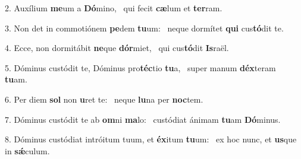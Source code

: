 2. Auxílium \textbf{me}um a \textbf{Dó}mino, \ast\  qui fecit \textbf{cæ}lum et \textbf{ter}ram.\

3. Non det in commotiónem \textbf{pe}dem \textbf{tu}um: \ast\  neque dormítet \textbf{qui} cus\textbf{tó}dit te.\

4. Ecce, non dormitábit \textbf{ne}que \textbf{dór}miet, \ast\  qui cus\textbf{tó}dit \textbf{Is}raël.\

5. Dóminus custódit te, Dóminus pro\textbf{téc}tio \textbf{tu}a, \ast\  super manum \textbf{déx}teram \textbf{tu}am.\

6. Per diem \textbf{sol} non \textbf{u}ret te: \ast\  neque \textbf{lu}na per \textbf{noc}tem.\

7. Dóminus custódit te ab \textbf{om}ni \textbf{ma}lo: \ast\  custódiat ánimam \textbf{tu}am \textbf{Dó}minus.\

8. Dóminus custódiat intróitum tuum, et \textbf{éx}itum \textbf{tu}um: \ast\  ex hoc nunc, et \textbf{us}que in \textbf{sǽ}culum.\

